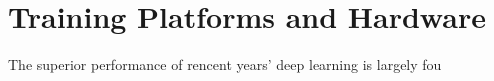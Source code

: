 \section{Training Platforms and Hardware}
The superior performance of rencent years' deep learning is largely fou
